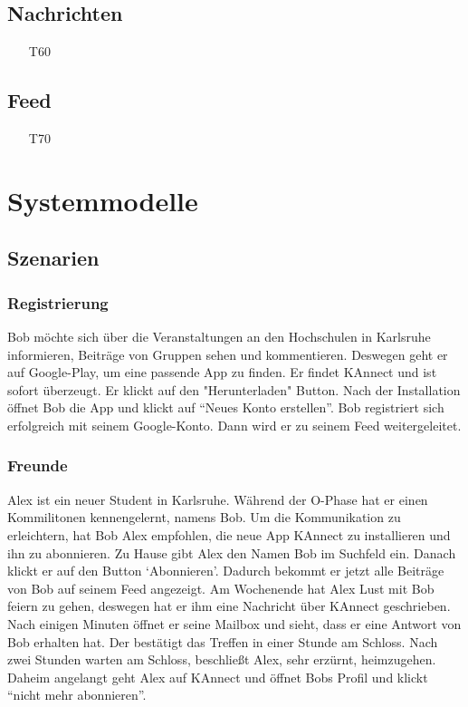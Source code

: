 \documentclass[parskip=full]{scrartcl}
\begin{document}
	
	\subsection{Nachrichten}
		
		\begin{itemize}
			\item[T60]
	
		\end{itemize}
	\subsection{Feed}
		\begin{itemize}
			\item[T70]
		\end{itemize}

	
	\newpage
	\section{Systemmodelle}
	\subsection{Szenarien}
		\subsubsection{Registrierung}
		Bob möchte sich über die Veranstaltungen an den Hochschulen in Karlsruhe informieren, Beiträge von Gruppen sehen und kommentieren. Deswegen geht er auf Google-Play, um eine passende App zu finden. Er findet KAnnect und ist sofort überzeugt. Er klickt auf den "Herunterladen" Button. Nach der Installation öffnet Bob die App und klickt auf “Neues Konto erstellen”. Bob registriert sich erfolgreich mit seinem Google-Konto. Dann wird er zu seinem \gls{Feed} weitergeleitet.
		
		\subsubsection{Freunde}
		Alex ist ein neuer Student in Karlsruhe.  Während der O-Phase hat er einen Kommilitonen kennengelernt, namens Bob. Um die Kommunikation zu erleichtern, hat Bob Alex empfohlen, die neue App  KAnnect zu installieren und ihn zu abonnieren. Zu Hause gibt Alex den Namen Bob im Suchfeld ein. Danach klickt er auf den Button ‘Abonnieren’. Dadurch bekommt er jetzt alle Beiträge von Bob auf seinem \gls{Feed} angezeigt. Am Wochenende hat Alex Lust mit Bob feiern zu gehen, deswegen hat er ihm eine Nachricht über KAnnect geschrieben. Nach einigen Minuten öffnet er seine Mailbox und sieht, dass er eine Antwort von Bob erhalten hat. Der bestätigt das Treffen in einer Stunde am Schloss. Nach zwei Stunden warten am Schloss, beschließt Alex, sehr erzürnt, heimzugehen. Daheim angelangt geht Alex auf KAnnect und öffnet Bobs Profil und klickt “nicht mehr abonnieren”.
		
\end{document}
